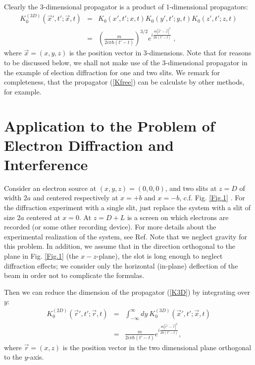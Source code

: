 \documentclass[12pt]{article}   %
\begin{document}
Clearly the 3-dimensional propagator is a product of 1-dimensional propagators:
\begin{eqnarray}\label{K3D}
K_{0}^{(3D)}(\overrightarrow{x}',t';\overrightarrow{x},t)&=&K_0(x',t';x,t)K_0(y',t';y,t)K_0(z',t';z,t)
{}\nonumber\\{}&=&\left(\frac{m}{2i\pi\hbar(t'-t)}\right)^{3/2}
e^{i\frac{m|\overrightarrow{x}'-\overrightarrow{x}|^2}{2\hbar(t'-t)}}\ , 
\end{eqnarray}
where $\overrightarrow{x}=(x,y,z)$ is the position vector in 3-dimensions.
Note that for reasons to be discussed below,
we shall not make use of the 3-dimensional propagator in the example 
of election diffraction for one and two slits. 
We remark for completeness, that the propagator (\ref{Kfree})
can be calculate by other methods, for example.\cite{Kleinert}


\section{Application to the Problem of Electron Diffraction and Interference}

Consider an electron source at $(x,y,z) = (0,0,0)$, and two slits
at $z=D$ of width $2a$ and centered respectively at $x=+b$ and
$x=-b$, c.f. Fig. \ref{Fig.1} . For the diffraction experiment with
a single slit, just replace the system with a slit of size $ 2a $
centered at $x=0$. At $ z = D + L $ is a screen on which electrons
are recorded (or some other recording device). For more details
about the experimental realization of the system, see Ref. \cite{Frabboni} 
Note that we neglect gravity for this
problem. In addition, we assume that in the direction orthogonal
to the plane in Fig. \ref{Fig.1} (the $x-z$-plane), the slot is long
enough to neglect diffraction effects; we consider only the
horizontal (in-plane) deflection of the beam in order not to
complicate the formulas. 

Then we can reduce the dimension of the propagator (\ref{K3D}) by integrating over $y$:
\begin{eqnarray}\label{K2D}
K_{0}^{(2D)}(\overrightarrow{r}',t';\overrightarrow{r},t)&=&
\int_{-\infty}^{\infty}dy\ K_{0}^{(3D)}(\overrightarrow{x}',t';\overrightarrow{x},t)
{}\nonumber\\{}&=&\frac{m}{2i\pi\hbar(t'-t)}
e^{i\frac{m|\overrightarrow{r}'-\overrightarrow{r}|^2}{2\hbar(t'-t)}},  
\end{eqnarray}
where $\overrightarrow{r}=(x,z)$ is the position vector in the two dimensional plane orthogonal to the $y$-axis.
\end{document}
